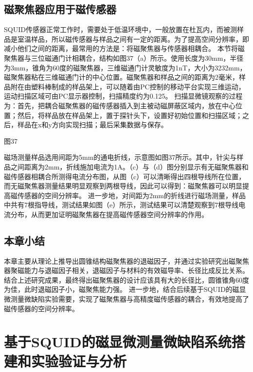 \documentclass[a4paper,12pt，twoside]{ctexart}
\begin{document}
	\subsection{磁聚焦器应用于磁传感器}
	
	SQUID传感器正常工作时，需要处于低温环境中，一般放置在杜瓦内，而被测样品是室温样品，所以磁传感器与样品之间有一定的距离。为了提高空间分辨率，即减小他们之间的距离，最常用的方法是：将磁聚焦器与传感器相耦合。
	本节将磁聚焦器与三位磁通门计相耦合，结构如图37（a）所示。使用长度为30mm，半径为3mm，锥角为60度的磁聚焦器，三维磁通门计灵敏度为1nT，大小为3232mm，磁聚焦器粘在三维磁通门计的中心位置。磁聚焦器和样品之间的距离为2毫米，样品附在由塑料棒制成的样品架上，可以随着由PC控制的移动平台实现三维运动，运动扫描区域可由PC显示器控制，扫描精度约为0.125。
	扫描显微镜观察的过程为：首先，把耦合磁聚焦器的磁传感器插入到主被动磁屏蔽区域内，放在中心位置；然后，将样品放在样品架上，置于探针头下，设置好初始位置和扫描区域；之后，样品在x和y方向实现扫描；最后采集数据与保存。\par 
	
	图37\par 
	磁场测量样品选用间距为5mm的通电折线，示意图如图37所示。其中，针尖与样品之间距离为2mm，折线施加电流为1A。（c）与（d）图分别显示有无磁聚焦器和磁传感器相耦合所测得电流分布图，从图（c）可以清晰得出四根导线所在位置，而无磁聚焦器测量结果明显观察到两根导线，因此可以得到：磁聚焦器可以明显提高磁传感器的空间分辨率。
	进一步地，对间距为2mm的折线进行磁场测量，样品中共有7根指导线，测试结果如图（e）所示，测试结果可以清楚观察到7根导线电流分布，从而更加证明磁聚焦器在提高磁传感器空间分辨率的作用。
	\subsection{本章小结}
	本章主要从理论上推导出圆锥结构磁聚焦器的退磁因子，并通过实验研究出磁聚焦器聚磁能力与退磁因子相关，退磁因子与材料的有效磁导率、长径比成反比关系。结合上述研究成果，最终得出磁聚焦器的设计应该具有大的长径比，圆锥锥角60度为佳，此时退磁因子小，磁聚焦能力强。
	进一步地，结合后续基于SQUID的磁显微测量微缺陷实验需要，实现了磁聚焦器与高精度磁传感器的耦合，有效地提高了磁传感器的空间分辨率。
		
	
	\newpage
	
	
	
	\section{基于SQUID的磁显微测量微缺陷系统搭建和实验验证与分析}
	
\end{document}

